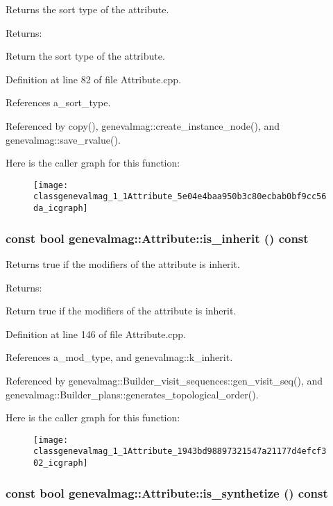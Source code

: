 Returns the sort type of the attribute. \begin{Desc}
\item[Returns:]\end{Desc}
Return the sort type of the attribute. 

Definition at line 82 of file Attribute.cpp.

References a\_\-sort\_\-type.

Referenced by copy(), genevalmag::create\_\-instance\_\-node(), and genevalmag::save\_\-rvalue().

Here is the caller graph for this function:\nopagebreak
\begin{figure}[H]
\begin{center}
\leavevmode
\texttt{[image: classgenevalmag\_1\_1Attribute\_5e04e4baa950b3c80ecbab0bf9cc56da\_icgraph]}
\end{center}
\end{figure}
\hypertarget{classgenevalmag_1_1Attribute_1943bd98897321547a21177d4efcf302}{
\subsubsection[{is\_\-inherit}]{\setlength{\rightskip}{0pt plus 5cm}const bool genevalmag::Attribute::is\_\-inherit () const}}
\label{classgenevalmag_1_1Attribute_1943bd98897321547a21177d4efcf302}


Returns true if the modifiers of the attribute is inherit. \begin{Desc}
\item[Returns:]\end{Desc}
Return true if the modifiers of the attribute is inherit. 

Definition at line 146 of file Attribute.cpp.

References a\_\-mod\_\-type, and genevalmag::k\_\-inherit.

Referenced by genevalmag::Builder\_\-visit\_\-sequences::gen\_\-visit\_\-seq(), and genevalmag::Builder\_\-plans::generates\_\-topological\_\-order().

Here is the caller graph for this function:\nopagebreak
\begin{figure}[H]
\begin{center}
\leavevmode
\texttt{[image: classgenevalmag\_1\_1Attribute\_1943bd98897321547a21177d4efcf302\_icgraph]}
\end{center}
\end{figure}
\hypertarget{classgenevalmag_1_1Attribute_adba4924920a427077f71234c9beb3b5}{
\subsubsection[{is\_\-synthetize}]{\setlength{\rightskip}{0pt plus 5cm}const bool genevalmag::Attribute::is\_\-synthetize () const}}
\label{classgenevalmag_1_1Attribute_adba4924920a427077f71234c9beb3b5}


